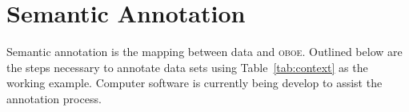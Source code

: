 \documentclass[article,oneside]{memoir}
\newcommand{\obs}{\textsc{oboe}}
\begin{document}
\pagebreak
\section{Semantic Annotation}

Semantic annotation is the mapping between data and \obs{}.  Outlined
below are the steps necessary to annotate data sets using
Table~\ref{tab:context} as the working example.  Computer software is
currently being develop to assist the annotation process.

\begin{figure}[hbtp]
\end{figure}
\end{document}
